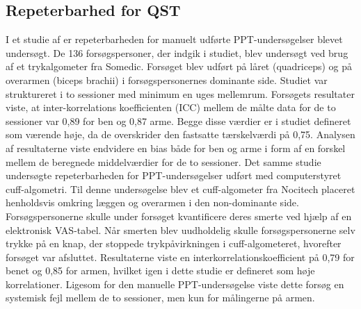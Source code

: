 \subsection{Repeterbarhed for QST}
I et studie af  er repeterbarheden for manuelt udførte PPT-undersøgelser blevet undersøgt. De 136 forsøgspersoner, der indgik i studiet, blev undersøgt ved brug af et trykalgometer fra Somedic. Forsøget blev udført på låret (quadriceps) og på overarmen (biceps brachii) i forsøgspersonernes dominante side. Studiet var struktureret i to sessioner med minimum en uges mellemrum. Forsøgets resultater viste, at inter-korrelations koefficienten (ICC) mellem de målte data for de to sessioner var 0,89 for ben og 0,87 arme. Begge disse værdier er i studiet defineret som værende høje, da de overskrider den fastsatte tærskelværdi på 0,75. Analysen af resultaterne viste endvidere en bias både for ben og arme i form af en forskel mellem de beregnede middelværdier for de to sessioner. Det samme studie undersøgte repeterbarheden for PPT-undersøgelser udført med computerstyret cuff-algometri. Til denne undersøgelse blev et cuff-algometer fra Nocitech placeret henholdsvis omkring læggen og overarmen i den non-dominante side. Forsøgspersonerne skulle under forsøget kvantificere deres smerte ved hjælp af en elektronisk VAS-tabel. Når smerten blev uudholdelig skulle forsøgspersonerne selv trykke på en knap, der stoppede trykpåvirkningen i cuff-algometeret, hvorefter forsøget var afsluttet. Resultaterne viste en interkorrelationskoefficient på 0,79 for benet og 0,85 for armen, hvilket igen i dette studie er defineret som høje korrelationer. Ligesom for den manuelle PPT-undersøgelse viste dette forsøg en systemisk fejl mellem de to sessioner, men kun for målingerne på armen.\\

